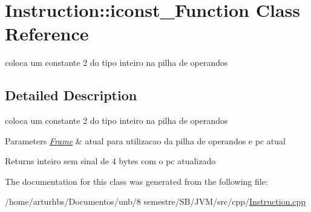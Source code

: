 \hypertarget{classInstruction_1_1iconst__2Function}{}\section{Instruction\+:\+:iconst\+\_\+Function Class Reference}
\label{classInstruction_1_1iconst__2Function}


coloca um constante 2 do tipo inteiro na pilha de operandos  




\subsection{Detailed Description}
coloca um constante 2 do tipo inteiro na pilha de operandos 


\begin{DoxyParams}{Parameters}
{\em \hyperlink{classFrame}{Frame}} & atual para utilizacao da pilha de operandos e pc atual \\
\hline
\end{DoxyParams}
\begin{DoxyReturn}{Returns}
inteiro sem sinal de 4 bytes com o pc atualizado 
\end{DoxyReturn}


The documentation for this class was generated from the following file\+:\begin{DoxyCompactItemize}
\item 
/home/arturhbs/\+Documentos/unb/8 semestre/\+S\+B/\+J\+V\+M/src/cpp/\hyperlink{Instruction_8cpp}{Instruction.\+cpp}\end{DoxyCompactItemize}
